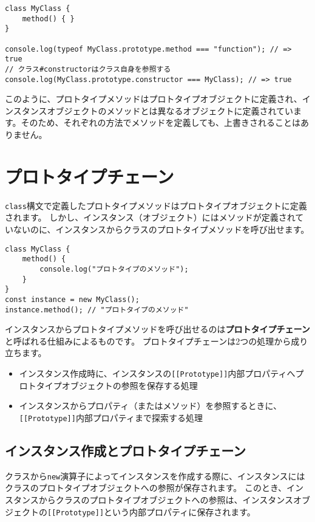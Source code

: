 \begin{lstlisting}
class MyClass {
    method() { }
}

console.log(typeof MyClass.prototype.method === "function"); // => true
// クラス#constructorはクラス自身を参照する
console.log(MyClass.prototype.constructor === MyClass); // => true
\end{lstlisting}

このように、プロトタイプメソッドはプロトタイプオブジェクトに定義され、インスタンスオブジェクトのメソッドとは異なるオブジェクトに定義されています。そのため、それぞれの方法でメソッドを定義しても、上書きされることはありません。

\hypertarget{prototype-chain}{%
\section{プロトタイプチェーン}\label{prototype-chain}}

\texttt{class}構文で定義したプロトタイプメソッドはプロトタイプオブジェクトに定義されます。
しかし、インスタンス（オブジェクト）にはメソッドが定義されていないのに、インスタンスからクラスのプロトタイプメソッドを呼び出せます。

\begin{lstlisting}
class MyClass {
    method() {
        console.log("プロトタイプのメソッド");
    }
}
const instance = new MyClass();
instance.method(); // "プロトタイプのメソッド"
\end{lstlisting}

インスタンスからプロトタイプメソッドを呼び出せるのは\textbf{プロトタイプチェーン}と呼ばれる仕組みによるものです。
プロトタイプチェーンは2つの処理から成り立ちます。

\begin{itemize}
\item
  インスタンス作成時に、インスタンスの\texttt{[[Prototype]]}内部プロパティへプロトタイプオブジェクトの参照を保存する処理
\item
  インスタンスからプロパティ（またはメソッド）を参照するときに、\texttt{[[Prototype]]}内部プロパティまで探索する処理
\end{itemize}

\hypertarget{write-prototype-chain}{%
\subsection{インスタンス作成とプロトタイプチェーン}\label{write-prototype-chain}}

クラスから\texttt{new}演算子によってインスタンスを作成する際に、インスタンスにはクラスのプロトタイプオブジェクトへの参照が保存されます。
このとき、インスタンスからクラスのプロトタイプオブジェクトへの参照は、インスタンスオブジェクトの\texttt{[[Prototype]]}という内部プロパティに保存されます。

